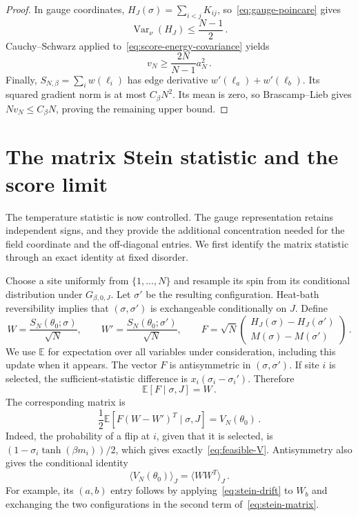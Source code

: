 \documentclass[11pt]{amsart}
\numberwithin{equation}{section}
\theoremstyle{remark}
\newcommand{\E}{\mathbb E}
\newcommand{\Var}{\operatorname{Var}}
\begin{document}
\begin{proof}
In gauge coordinates, $H_J(\sigma)=\sum_{i<j}K_{ij}$, so~\eqref{eq:gauge-poincare} gives
\begin{equation*}
 \Var_\nu(H_J)\le\frac{N-1}2\,.
\end{equation*}
Cauchy--Schwarz applied to~\eqref{eq:score-energy-covariance} yields
\begin{equation}
 v_N\ge\frac{2N}{N-1}a_N^2\,.
 \label{eq:variance-lower}
\end{equation}
Finally, $S_{N,\beta}=\sum_iw(\ell_i)$ has edge derivative $w'(\ell_a)+w'(\ell_b)$. Its squared gradient norm is at most $C_\beta N^2$. Its mean is zero, so Brascamp--Lieb gives $Nv_N\le C_\beta N$, proving the remaining upper bound.
\end{proof}

\section{The matrix Stein statistic and the score limit}\label{sec:score}

The temperature statistic is now controlled. The gauge representation retains independent signs, and they provide the additional concentration needed for the field coordinate and the off-diagonal entries. We first identify the matrix statistic through an exact identity at fixed disorder.

Choose a site uniformly from $\{1,\ldots,N\}$ and resample its spin from its conditional distribution under $G_{\beta,0,J}$. Let $\sigma'$ be the resulting configuration. Heat-bath reversibility implies that $(\sigma,\sigma')$ is exchangeable conditionally on $J$. Define
\begin{equation}
 W=\frac{S_N(\theta_0;\sigma)}{\sqrt N},\qquad
 W'=\frac{S_N(\theta_0;\sigma')}{\sqrt N},\qquad
 F=\sqrt N\begin{pmatrix}H_J(\sigma)-H_J(\sigma')\\M(\sigma)-M(\sigma')\end{pmatrix}\,.
 \label{eq:stein-coupling}
\end{equation}
We use $\E$ for expectation over all variables under consideration, including this update when it appears. The vector $F$ is antisymmetric in $(\sigma,\sigma')$. If site $i$ is selected, the sufficient-statistic difference is $x_i(\sigma_i-\sigma_i')$. Therefore
\begin{equation}
 \E[F\mid\sigma,J]=W\,.
 \label{eq:stein-drift}
\end{equation}
The corresponding matrix is
\begin{equation}
 \frac12\E[F(W-W')^T\mid\sigma,J]=V_N(\theta_0)\,.
 \label{eq:stein-matrix}
\end{equation}
Indeed, the probability of a flip at $i$, given that it is selected, is $(1-\sigma_i\tanh(\beta m_i))/2$, which gives exactly~\eqref{eq:feasible-V}. Antisymmetry also gives the conditional identity
\begin{equation}
 \langle V_N(\theta_0)\rangle_J=\langle WW^T\rangle_J\,.
 \label{eq:matrix-mean}
\end{equation}
For example, its $(a,b)$ entry follows by applying~\eqref{eq:stein-drift} to $W_b$ and exchanging the two configurations in the second term of~\eqref{eq:stein-matrix}.
\end{document}
